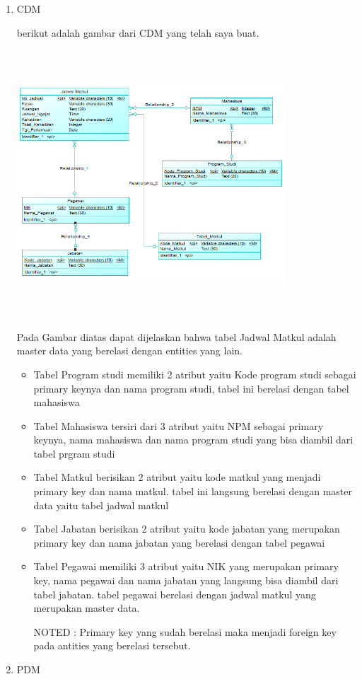 \documentclass[12pt]{article}
\begin{document}
\begin{enumerate}
 \item CDM


berikut adalah gambar dari CDM yang telah saya buat.
\begin{center}
\includegraphics[width=10cm, height=10cm]{CDM.png}
\end{center}

Pada Gambar diatas dapat dijelaskan bahwa tabel Jadwal Matkul adalah master data yang berelasi dengan entities yang lain.
\begin{itemize}
  \item Tabel Program studi memiliki 2 atribut yaitu Kode program studi sebagai primary keynya dan nama program studi, tabel ini berelasi dengan tabel mahasiswa
  \item Tabel Mahasiswa tersiri dari 3 atribut yaitu NPM sebagai primary keynya, nama mahasiswa dan nama program studi yang bisa diambil dari tabel prgram studi
  \item Tabel Matkul berisikan 2 atribut yaitu kode matkul yang menjadi primary key dan nama matkul. tabel ini langsung berelasi dengan master data yaitu tabel jadwal matkul
  \item Tabel Jabatan berisikan 2 atribut yaitu kode jabatan yang merupakan primary key dan nama jabatan yang berelasi dengan tabel pegawai
  \item Tabel Pegawai memiliki 3 atribut yaitu NIK yang merupakan primary key, nama pegawai dan nama jabatan yang langsung bisa diambil dari tabel jabatan. tabel pegawai berelasi dengan jadwal matkul yang merupakan master data.
  
  NOTED : Primary key yang sudah berelasi maka menjadi foreign key pada antities yang berelasi tersebut.
        \hspace*{3cm}
\end{itemize} 
        

 \item PDM
\end{enumerate} 
        
\end{document}
